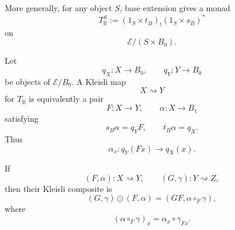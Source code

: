 More generally, for any object \(S\), base extension gives a monad
\[
    T_{\mathbb B}^S
    :=
    (1_S\times t_B)_!
    (1_S\times s_B)^*
\]
on
\[
    \mathcal E/(S\times B_0).
\]

\begin{proposition}
\label{prop:to-kleisli-normal-form}
    Let
    \[
        q_X:X\to B_0,
        \qquad
        q_Y:Y\to B_0
    \]
    be objects of \(\mathcal E/B_0\). A Kleisli map
    \[
        X\rightsquigarrow Y
    \]
    for \(T_{\mathbb B}\) is equivalently a pair
    \[
        F:X\to Y,
        \qquad
        \alpha:X\to B_1
    \]
    satisfying
    \[
        s_B\alpha=q_YF,
        \qquad
        t_B\alpha=q_X.
    \]
    Thus
    \[
        \alpha_x:q_Y(Fx)\to q_X(x).
    \]

    If
    \[
        (F,\alpha):X\rightsquigarrow Y,
        \qquad
        (G,\gamma):Y\rightsquigarrow Z,
    \]
    then their Kleisli composite is
    \[
        (G,\gamma)\odot(F,\alpha)
        =
        (GF,\alpha\circ_F\gamma),
    \]
    where
    \[
        (\alpha\circ_F\gamma)_x
        =
        \alpha_x\circ\gamma_{Fx}.
    \]
\end{proposition}


